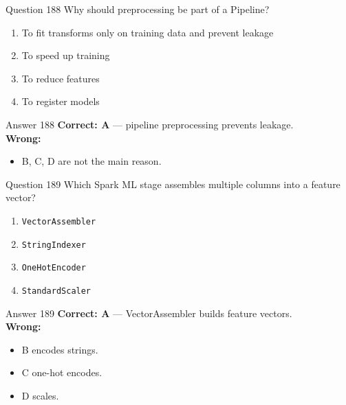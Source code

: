 \documentclass[aspectratio=169,11pt]{beamer}
\begin{document}
	\begin{frame}{Question 188}
		Why should preprocessing be part of a Pipeline?
		\begin{enumerate}[label=\Alph*.]
			\item To fit transforms only on training data and prevent leakage
			\item To speed up training
			\item To reduce features
			\item To register models
		\end{enumerate}
	\end{frame}
	\begin{frame}{Answer 188}
		\textbf{Correct: A} --- pipeline preprocessing prevents leakage.\\
		\vspace{0.5em}
		\textbf{Wrong:}
		\begin{itemize}
			\item B, C, D are not the main reason.
		\end{itemize}
	\end{frame}
	
	\begin{frame}{Question 189}
		Which Spark ML stage assembles multiple columns into a feature vector?
		\begin{enumerate}[label=\Alph*.]
			\item \texttt{VectorAssembler}
			\item \texttt{StringIndexer}
			\item \texttt{OneHotEncoder}
			\item \texttt{StandardScaler}
		\end{enumerate}
	\end{frame}
	\begin{frame}{Answer 189}
		\textbf{Correct: A} --- VectorAssembler builds feature vectors.\\
		\vspace{0.5em}
		\textbf{Wrong:}
		\begin{itemize}
			\item B encodes strings.
			\item C one-hot encodes.
			\item D scales.
		\end{itemize}
	\end{frame}
	
\end{document}
